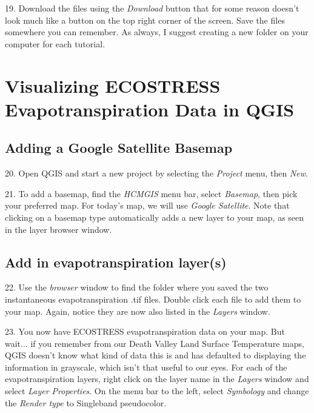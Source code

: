 \documentclass[oneside,a4paper,11pt,explicit]{book}
\begin{document}
\vspace{.5em}


19. Download the files using the \textit{Download} button that for some reason doesn't look much like a button on the top right corner of the screen. Save the files somewhere you can remember. As always, I suggest creating  a new folder on your computer for each tutorial.

\section{Visualizing ECOSTRESS Evapotranspiration Data in QGIS}

\subsection{Adding a Google Satellite Basemap}

20. Open QGIS and start a new project by selecting the \textit{Project} menu, then \textit{New}.

21. To add a basemap, find the \textit{HCMGIS} menu bar, select \textit{Basemap}, then pick your preferred map. For today's map, we will use \textit{Google Satellite}. Note that clicking on a basemap type automatically adds a new layer to your map, as seen in the layer browser window.

\subsection{Add in evapotranspiration layer(s)}

22. Use the \textit{browser} window to find the folder where you saved the two instantaneous evapotranspiration .tif files. Double click each file to add them to your map. Again, notice they are now also listed in the \textit{Layers} window.

23. You now have ECOSTRESS evapotranspiration data on your map. But wait... if you remember from our Death Valley Land Surface Temperature maps, QGIS doesn't know what kind of data this is and has defaulted to displaying the information in grayscale, which isn't that useful to our eyes. For each of the evapotranspiration layers, right click on the layer name in the \textit{Layers} window and select \textit{Layer Properties}. On the menu bar to the left, select \textit{Symbology} and change the \textit{Render type} to Singleband pseudocolor. 
\end{document}
